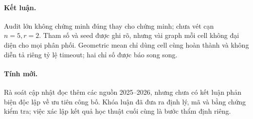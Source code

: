 \paragraph{Kết luận.} Audit lớn không chứng minh đúng thay cho chứng minh; chưa vét cạn $n=5,r=2$. Tham số và seed được ghi rõ, nhưng vài graph mỗi cell không đại diện cho mọi phân phối. Geometric mean chỉ dùng cell cùng hoàn thành và không diễn tả riêng tỷ lệ timeout; hai chỉ số được báo song song.

\paragraph{Tính mới.} Rà soát cập nhật đọc thêm các nguồn 2025--2026, nhưng chưa có kết luận phản biện độc lập về ưu tiên công bố. Khóa luận đã đưa ra định lý, mã và bằng chứng kiểm tra; việc xác lập kết quả học thuật cuối cùng là bước thẩm định riêng.
